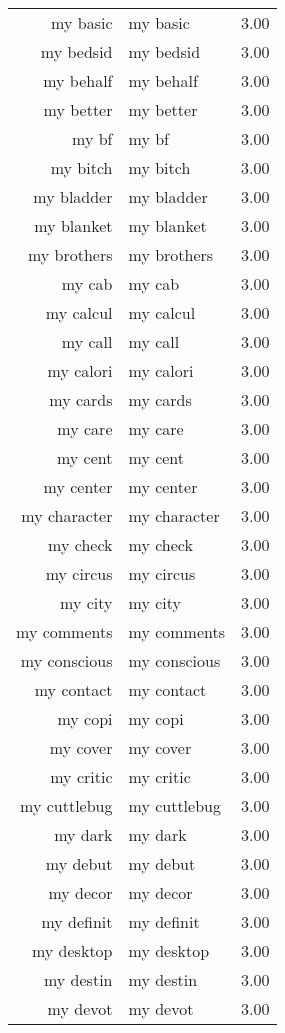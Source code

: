 \begin{table}[ht]
\begin{tabular}{rlr}
  my basic & my basic & 3.00 \\ 
  my bedsid & my bedsid & 3.00 \\ 
  my behalf & my behalf & 3.00 \\ 
  my better & my better & 3.00 \\ 
  my bf & my bf & 3.00 \\ 
  my bitch & my bitch & 3.00 \\ 
  my bladder & my bladder & 3.00 \\ 
  my blanket & my blanket & 3.00 \\ 
  my brothers & my brothers & 3.00 \\ 
  my cab & my cab & 3.00 \\ 
  my calcul & my calcul & 3.00 \\ 
  my call & my call & 3.00 \\ 
  my calori & my calori & 3.00 \\ 
  my cards & my cards & 3.00 \\ 
  my care & my care & 3.00 \\ 
  my cent & my cent & 3.00 \\ 
  my center & my center & 3.00 \\ 
  my character & my character & 3.00 \\ 
  my check & my check & 3.00 \\ 
  my circus & my circus & 3.00 \\ 
  my city & my city & 3.00 \\ 
  my comments & my comments & 3.00 \\ 
  my conscious & my conscious & 3.00 \\ 
  my contact & my contact & 3.00 \\ 
  my copi & my copi & 3.00 \\ 
  my cover & my cover & 3.00 \\ 
  my critic & my critic & 3.00 \\ 
  my cuttlebug & my cuttlebug & 3.00 \\ 
  my dark & my dark & 3.00 \\ 
  my debut & my debut & 3.00 \\ 
  my decor & my decor & 3.00 \\ 
  my definit & my definit & 3.00 \\ 
  my desktop & my desktop & 3.00 \\ 
  my destin & my destin & 3.00 \\ 
  my devot & my devot & 3.00 \\ 

\end{tabular}
\end{table}
